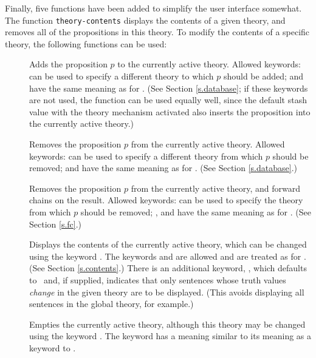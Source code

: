 Finally, five functions have been added to simplify the user
interface somewhat.  The function {\tt theory-\-contents} displays
the contents of a given theory, and  removes all
of the propositions in this theory.  To modify the contents of a
specific theory, the following functions can be used:
 \begin{description}
 \item [] Adds the proposition $p$ to the
currently active theory.  Allowed keywords:  can
be used to specify a different theory to which $p$ should be added;
 and  have the same meaning as for
.  (See Section \ref{s.database}; if these keywords are
not used, the function  can be used equally well, since
the default stash value with the theory mechanism activated also
inserts the proposition into the currently active theory.)
 \item [] Removes the proposition $p$
from the currently active theory.  Allowed keywords:
 can be used to specify a different theory from which
$p$ should be removed;  and  have the
same meaning as for .  (See Section \ref{s.database}.)
 \item [] Removes the proposition $p$
from the currently active theory, and forward chains on the result.
Allowed keywords:  can be used to specify the theory from
which $p$ should be removed; ,  and
 have the same meaning as for .  (See
Section \ref{s.fc}.)
 \item [] Displays the contents of the
currently active theory, which can be changed using the
keyword .  The keywords  and 
are allowed and are treated as for .  (See Section
\ref{s.contents}.)  There is an additional keyword,
, which defaults to \T\ and, if supplied,
indicates that only sentences whose truth values {\em change\/} in the
given theory are to be displayed.  (This avoids displaying all
sentences in the global theory, for example.)
 \item [] Empties the currently active
theory, although this theory may be changed using the keyword
.  The keyword  has a meaning similar to its
meaning as a keyword to .
 \end{description}

